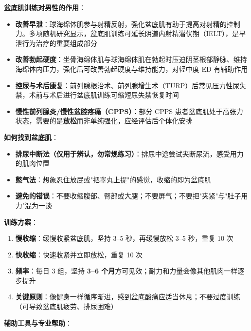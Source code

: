 \vspace{0.5em}
\noindent\textbf{盆底肌训练对男性的作用}：

\begin{itemize}[leftmargin=2cm]
	\item \textbf{改善早泄}：球海绵体肌参与射精反射，强化盆底肌有助于提高对射精的控制力。多项随机研究显示，盆底肌训练可延长阴道内射精潜伏期（IELT），是早泄行为治疗的重要组成部分
	\item \textbf{改善勃起硬度}：坐骨海绵体肌与球海绵体肌在勃起时压迫阴茎根部静脉、维持海绵体内压力，强化后可改善勃起硬度与维持能力，对轻中度 ED 有辅助作用
	\item \textbf{控尿与术后康复}：前列腺根治术、前列腺增生术（TURP）后常见压力性尿失禁，术前与术后进行盆底肌训练可缩短尿失禁恢复时间
	\item \textbf{慢性前列腺炎/慢性盆腔疼痛（CPPS）}：部分 CPPS 患者盆底肌处于高张力状态，需要的是\textbf{放松}而非单纯强化，应经评估后个体化安排
\end{itemize}

\vspace{0.5em}
\noindent\textbf{如何找到盆底肌}：

\begin{itemize}[leftmargin=2cm]
	\item \textbf{排尿中断法（仅用于辨认，勿常规练习）}：排尿中途尝试夹断尿流，感受用力的肌肉位置
	\item \textbf{憋气法}：想象忍住放屁或"把睾丸上提"的感觉，收缩的即为盆底肌
	\item \textbf{避免的错误}：不要收缩腹部、臀部或大腿；不要屏气；不要把"夹紧"与"肚子用力"混为一谈
\end{itemize}

\vspace{0.5em}
\noindent\textbf{训练方案}：

\begin{enumerate}
	\item \textbf{慢收缩}：缓慢收紧盆底肌，坚持 3--5 秒，再缓慢放松 3--5 秒，重复 10 次
	\item \textbf{快收缩}：快速收紧并立即放松，重复 10 次
	\item \textbf{频率}：每日 3 组，坚持 \textbf{3--6 个月}方可见效；耐力和力量会像其他肌肉一样逐步提升
	\item \textbf{关键原则}：像健身一样循序渐进，感到盆底酸痛应适当休息；不要过度训练（可导致盆底肌疲劳、排尿困难）
\end{enumerate}

\vspace{0.5em}
\noindent\textbf{辅助工具与专业帮助}：

